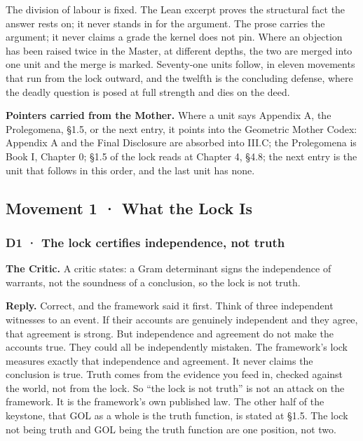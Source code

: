 \documentclass[10pt,twocolumn]{article}
\begin{document}
The division of labour is fixed. The Lean excerpt proves the structural
fact the answer rests on; it never stands in for the argument. The prose
carries the argument; it never claims a grade the kernel does not pin.
Where an objection has been raised twice in the Master, at different
depths, the two are merged into one unit and the merge is marked.
Seventy-one units follow, in eleven movements that run from the lock
outward, and the twelfth is the concluding defense, where the deadly
question is posed at full strength and dies on the deed.

\textbf{Pointers carried from the Mother.} Where a unit says Appendix A,
the Prolegomena, §1.5, or the next entry, it points into the Geometric
Mother Codex: Appendix A and the Final Disclosure are absorbed into
III.C; the Prolegomena is Book I, Chapter 0; §1.5 of the lock reads at
Chapter 4, §4.8; the next entry is the unit that follows in this order,
and the last unit has none.

\hypertarget{movement-1-what-the-lock-is}{%
\subsection{Movement 1 · What the Lock
Is}\label{movement-1-what-the-lock-is}}

\hypertarget{d1-the-lock-certifies-independence-not-truth}{%
\subsubsection{D1 · The lock certifies independence, not
truth}\label{d1-the-lock-certifies-independence-not-truth}}

\textbf{The Critic.} A critic states: a Gram determinant signs the
independence of warrants, not the soundness of a conclusion, so the lock
is not truth.

\textbf{Reply.} Correct, and the framework said it first. Think of three
independent witnesses to an event. If their accounts are genuinely
independent and they agree, that agreement is strong. But independence
and agreement do not make the accounts true. They could all be
independently mistaken. The framework's lock measures exactly that
independence and agreement. It never claims the conclusion is true.
Truth comes from the evidence you feed in, checked against the world,
not from the lock. So ``the lock is not truth'' is not an attack on the
framework. It is the framework's own published law. The other half of
the keystone, that GOL as a whole is the truth function, is stated at
§1.5. The lock not being truth and GOL being the truth function are one
position, not two.
\end{document}
